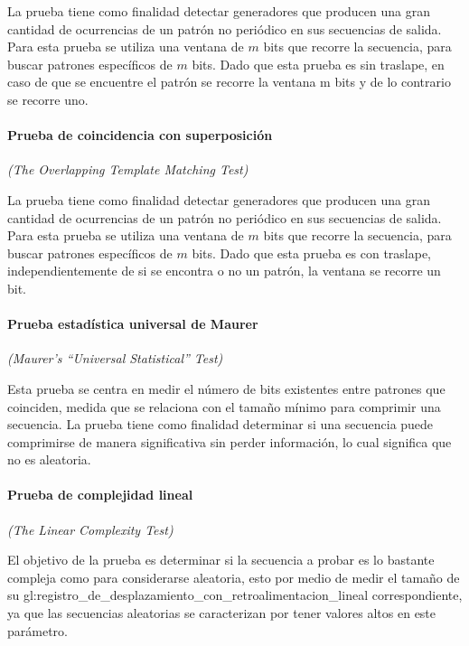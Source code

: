 La prueba tiene como finalidad detectar generadores que producen una gran
cantidad de ocurrencias de un patrón no periódico en sus secuencias de salida.
Para esta prueba se utiliza una ventana de $m$ bits que recorre la secuencia,
para buscar patrones específicos de $m$ bits. Dado que esta prueba es sin
traslape, en caso de que se encuentre el patrón se recorre la ventana m bits
y de lo contrario se recorre uno.

\paragraph{Prueba de coincidencia con superposición} %
\textit{(The Overlapping Template Matching Test)}

La prueba tiene como finalidad detectar generadores que producen una gran
cantidad de ocurrencias de un patrón no periódico en sus secuencias de salida.
Para esta prueba se utiliza una ventana de $m$ bits que recorre la secuencia,
para buscar patrones específicos de $m$ bits. Dado que esta prueba es con
traslape, independientemente de si se encontra o no un patrón, la ventana se
recorre un bit.

\paragraph{Prueba estadística universal de Maurer} %
\textit{(Maurer’s “Universal Statistical” Test)}

Esta prueba se centra en medir el número de bits existentes entre patrones
que coinciden, medida que se relaciona con el tamaño mínimo para comprimir
una secuencia. La prueba tiene como finalidad determinar si una secuencia
puede comprimirse de manera significativa sin perder información, lo cual
significa que no es aleatoria.

\paragraph{Prueba de complejidad lineal} %
\textit{(The Linear Complexity Test)}

El objetivo de la prueba es determinar si la secuencia a probar es lo bastante
compleja como para considerarse aleatoria, esto por medio de medir el tamaño de
su \gls{gl:registro_de_desplazamiento_con_retroalimentacion_lineal}
correspondiente, ya que las secuencias aleatorias se caracterizan por tener
valores altos en este parámetro.

